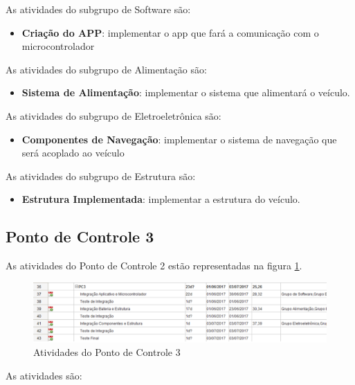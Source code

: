 \begin{apendicesenv}
			As atividades do subgrupo de Software são:
			
			\begin{itemize}
				\item \textbf{Criação do APP}: implementar o app que fará a comunicação com o microcontrolador
			\end{itemize}
			
			As atividades do subgrupo de Alimentação são:
			\begin{itemize}
				\item \textbf{Sistema de Alimentação}: implementar o sistema que alimentará o veículo.
			\end{itemize}
			
			As atividades do subgrupo de Eletroeletrônica são:
			\begin{itemize}
				\item \textbf{Componentes de Navegação}: implementar o sistema de navegação que será acoplado ao veículo
			\end{itemize}
			
			As atividades do subgrupo de Estrutura são:
			\begin{itemize}
				\item \textbf{Estrutura Implementada}: implementar a estrutura do veículo.
			\end{itemize}
			
			\subsection{Ponto de Controle 3}
			As atividades do Ponto de Controle 2 estão representadas na figura \ref{img:PC3}.
		
		\graphicspath{{figuras/}}
			\begin{figure}[h!]
			\centering
			\includegraphics[scale=0.60]{PC3}
			\caption{Atividades do Ponto de Controle 3}
			\label{img:PC3}
			\end{figure}
			
			As atividades são:
			

\end{apendicesenv}
